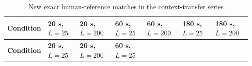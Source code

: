 \documentclass[pdflatex,sn-basic,Numbered]{sn-jnl}
\begin{document}
\begin{longtable}[]{@{}
  >{\raggedright\arraybackslash}p{}
  >{\raggedleft\arraybackslash}p{}
  >{\raggedleft\arraybackslash}p{}
  >{\raggedleft\arraybackslash}p{}
  >{\raggedleft\arraybackslash}p{}
  >{\raggedleft\arraybackslash}p{}
  >{\raggedleft\arraybackslash}p{}@{}}
\caption{New exact human-reference matches in the context-transfer series}\label{tab:20}\tabularnewline
\toprule\noalign{}
\begin{minipage}[b]{\linewidth}\raggedright
\textbf{Condition}
\end{minipage} & \begin{minipage}[b]{\linewidth}\raggedleft
\textbf{20 s,} \(L = 25\)
\end{minipage} & \begin{minipage}[b]{\linewidth}\raggedleft
\textbf{20 s,} \(L = 200\)
\end{minipage} & \begin{minipage}[b]{\linewidth}\raggedleft
\textbf{60 s,} \(L = 25\)
\end{minipage} & \begin{minipage}[b]{\linewidth}\raggedleft
\textbf{60 s,} \(L = 200\)
\end{minipage} & \begin{minipage}[b]{\linewidth}\raggedleft
\textbf{180 s,} \(L = 25\)
\end{minipage} & \begin{minipage}[b]{\linewidth}\raggedleft
\textbf{180 s,} \(L = 200\)
\end{minipage} \\
\midrule\noalign{}
\endfirsthead
\toprule\noalign{}
\begin{minipage}[b]{\linewidth}\raggedright
\textbf{Condition}
\end{minipage} & \begin{minipage}[b]{\linewidth}\raggedleft
\textbf{20 s,} \(L = 25\)
\end{minipage} & \begin{minipage}[b]{\linewidth}\raggedleft
\textbf{20 s,} \(L = 200\)
\end{minipage} & \begin{minipage}[b]{\linewidth}\raggedleft
\textbf{60 s,} \(L = 25\)
\end{minipage} & \begin{minipage}[b]{\linewidth}\raggedleft

\end{minipage}
\end{longtable}
\end{document}
